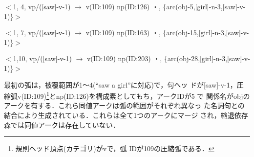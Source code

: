 \myhalfskip

 $<$1, 4, vp/([saw]-v-1) $\rightarrow$ v(ID:109) np(ID:126) ・, \{arc(obj-5,[girl]-n-3,[saw]-v-1)\}$>$

 $<$1, 7, vp/([saw]-v-1) $\rightarrow$ v(ID:109) np(ID:163) ・, \{arc(obj-15,[girl]-n-3,[saw]-v-1)\}$>$

 $<$1,10, vp/([saw]-v-1) $\rightarrow$ v(ID:109) np(ID:203) ・, \{arc(obj-28,[girl]-n-3,[saw]-v-1)\}$>$

\myhalfskip
{\mynoindent}最初の弧は，被覆範囲が1〜4(``saw a girl''に対応)で，句ヘッ
ドが[saw]-v-1，圧縮弧v(ID:109)\footnote{規則ヘッド頂点(カテゴリ)がvで，弧
IDが109の圧縮弧である．}とnp(ID:126)を構成素としてもち，アークIDが5 で
関係名がobjのアークを有する．これら同値アークは弧の範囲がそれぞれ異なっ
た名詞句との結合により生成されている．これらは全て1つのアークにマージ
され，縮退依存森では同値アークは存在していない．

\begin{comment}
同値アーク[[(5),15,28],[(13),32],[(14),33],[(11),27]]
最終アーク 30, 4, 5,13,14,10,11,25,23,26,20,21,35

(obj-5)：
スコープが異なる：ノードの範囲とは無関係にマージ可能としている
（できる場合とできない場合の弁別を入れることが考えられる）
** new arcid: arc_share(obj-15,[girl]-n-3,[saw]-v-1)
 173:[1,7] vp/([saw]-v-1)--> [109 163]* : [[arc(obj-15,[girl]-n-3,[saw]-v-1)]]
** new arcid: arc_share(obj-5,[girl]-n-3,[saw]-v-1)
 135:[1,4] vp/([saw]-v-1)--> [109 126]* : [[arc(obj-5,[girl]-n-3,[saw]-v-1)]]
** new arcid: arc_share(obj-28,[girl]-n-3,[saw]-v-1)
 222:[1,10] vp/([saw]-v-1)--> [109 203]* : [[arc(obj-28,[girl]-n-3,[saw]-v-1)]]

163:[2,7] np/([girl]-n-3)--> [126 161]* : [[arc(npp-13,[with]-pre-4,[girl]-n-3)]]
126:[2,4] np/([girl]-n-3)--> [119 122]* : [[arc(det-4,[a]-det-2,[girl]-n-3)]]
203:[2,10] np/([girl]-n-3)--> [163 199]* : [[arc(npp-25,[in]-pre-7,[girl]-n-3)]]

--
npp-13の同値アーク：
163:[2,7] np/([girl]-n-3)--> [126 161]* : [[arc(npp-13,[with]-pre-4,[girl]-n-3)]]
228:[2,10] np/([girl]-n-3)--> [126 213]* : [[arc(npp-32,[with]-pre-4,[girl]-n-3)]]


====== Number of various trees ========
[Parse Forest]
(a) Parse Forest Size : 25
(b) Number of collection of parse trees : 5
(c) Number of set of parse trees : 5
[Dependency Forest]
(I-1) Initial DF size : 18
(I-2) Initial DF ID-tree collection number : 5
(I-3) Initial DF ID-tree set number : 5
(I-4) Initial DF Generalized-tree number : 5
(R-1) Reduced DF size : 13
(R-2) Reduced DF ID-tree collection number : 5
(R-3) Reduced DF ID-tree set number : 5
(R-4) Reduced DF Generalized-tree number : 5
\end{comment}

